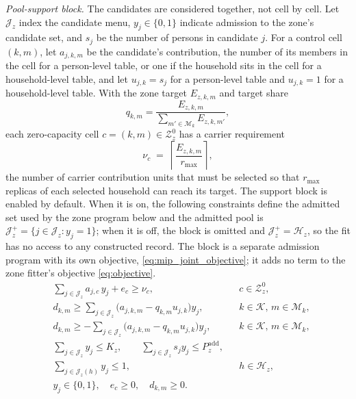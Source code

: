 \emph{Pool-support block.} The candidates are considered together, not
cell by cell. Let $\mathcal{J}_z$ index the candidate menu,
$y_j\in\{0,1\}$ indicate admission to the zone's candidate set, and $s_j$ be
the number of persons in candidate $j$. For a control cell $(k,m)$, let $a_{j,k,m}$ be the candidate's
contribution, the number of its members in the cell for a person-level table, or
one if the household sits in the cell for a household-level table, and let
$u_{j,k}=s_j$ for a person-level table and $u_{j,k}=1$ for a household-level
table. With the zone target $E_{z,k,m}$ and target share
\begin{equation}
q_{k,m}=\frac{E_{z,k,m}}{\sum_{m'\in\mathcal{M}_k}E_{z,k,m'}},
\label{eq:mip_share}
\end{equation}
each zero-capacity cell $c=(k,m)\in\mathcal{Z}_z^0$ has a carrier requirement
\begin{equation}
\nu_c \;=\; \left\lceil \frac{E_{z,k,m}}{r_{\max}} \right\rceil ,
\label{eq:mip_carrier_requirement}
\end{equation}
the number of carrier contribution units that must be selected so that
$r_{\max}$ replicas of each selected household can reach its target. The
support block is enabled by default. When it is on, the following constraints
define the admitted set used by the zone program below and the admitted pool is
\(\mathcal{J}_z^{+}=\{j\in\mathcal{J}_z:y_j=1\}\); when it is off, the block is
omitted and \(\mathcal{J}_z^{+}=\mathcal{H}_z\), so the fit has no access to
any constructed record. The block is a separate admission program with its own
objective, \eqref{eq:mip_joint_objective}; it adds no term to the zone fitter's
objective \eqref{eq:objective}.
\begin{equation}
\begin{aligned}
& \sum_{j\in\mathcal{J}_z} a_{j,c}\,y_j+e_c\ge \nu_c,
&& c\in\mathcal{Z}_z^0,\\
& d_{k,m}\ge \sum_{j\in\mathcal{J}_z}
  \bigl(a_{j,k,m}-q_{k,m}u_{j,k}\bigr)y_j,
&& k\in\mathcal{K},\,m\in\mathcal{M}_k,\\
& d_{k,m}\ge -\sum_{j\in\mathcal{J}_z}
  \bigl(a_{j,k,m}-q_{k,m}u_{j,k}\bigr)y_j,
&& k\in\mathcal{K},\,m\in\mathcal{M}_k,\\
& \sum_{j\in\mathcal{J}_z}y_j\le K_z,\qquad
  \sum_{j\in\mathcal{J}_z}s_jy_j\le P_z^{\mathrm{add}},\\
& \sum_{j\in\mathcal{J}_z(h)}y_j\le 1,
&& h\in\mathcal{H}_z,\\
& y_j\in\{0,1\},\quad e_c\ge 0,\quad d_{k,m}\ge 0.
\end{aligned}
\label{eq:mip_joint}
\end{equation}

